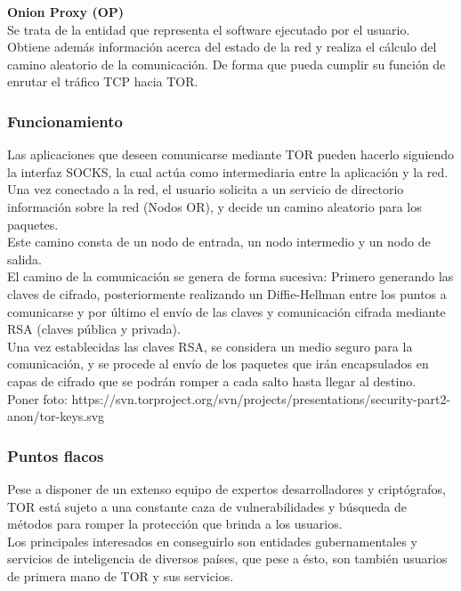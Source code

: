 \textbf {Onion Proxy (OP)} \\
Se trata de la entidad que representa el software ejecutado por el usuario. Obtiene además información acerca del estado de la red y realiza el cálculo del camino aleatorio de la comunicación. De forma que pueda cumplir su función de enrutar el tráfico TCP hacia TOR.

\subsubsection {Funcionamiento}

Las aplicaciones que deseen comunicarse mediante TOR pueden hacerlo siguiendo la interfaz SOCKS, la cual actúa como intermediaria entre la aplicación y la red. \\

Una vez conectado a la red, el usuario solicita a un servicio de directorio información sobre la red (Nodos OR), y decide un camino aleatorio para los paquetes. \\ Este camino consta de un nodo de entrada, un nodo intermedio y un nodo de salida. \\

El camino de la comunicación se genera de forma sucesiva: Primero generando las claves de cifrado, posteriormente realizando un Diffie-Hellman entre los puntos a comunicarse	y por último el envío de las claves y comunicación cifrada mediante RSA (claves pública y privada). \\

Una vez establecidas las claves RSA, se considera un medio seguro para la comunicación, y se procede al envío de los paquetes que irán encapsulados en capas de cifrado que se podrán romper a cada salto hasta llegar al destino. \\ 

Poner foto: https://svn.torproject.org/svn/projects/presentations/security-part2-anon/tor-keys.svg

\subsubsection {Puntos flacos}

Pese a disponer de un extenso equipo de expertos desarrolladores y criptógrafos, TOR está sujeto a una constante caza de vulnerabilidades y búsqueda de métodos para romper la protección que brinda a los usuarios. \\
Los principales interesados en conseguirlo son entidades gubernamentales y servicios de inteligencia de diversos países, que pese a ésto, son también usuarios de primera mano de TOR y sus servicios. \\ 

